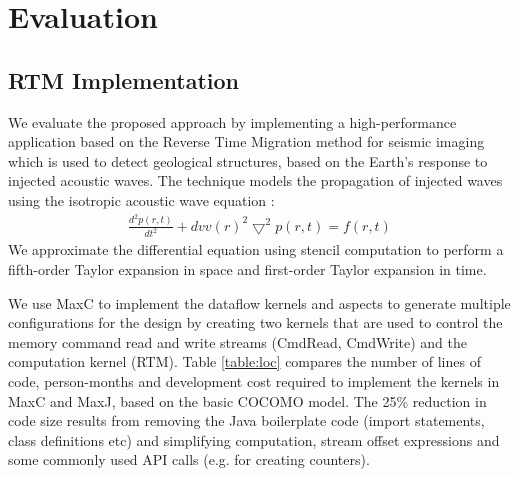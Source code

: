 \section{Evaluation}

\subsection{RTM Implementation}
We evaluate the proposed approach by implementing a high-performance
application based on the Reverse Time Migration method for seismic
imaging which is used to detect geological structures, based on the
Earth's response to injected acoustic waves. The technique models the
propagation of injected waves using the isotropic acoustic wave
equation \cite{araya2011assessing}:
\begin{align}
\frac{d^2p(r,t)}{dt^2} + {dvv(r)}^2\bigtriangledown^2p(r,t) = f(r,t)
\end{align}
We approximate the differential equation using stencil computation to
perform a fifth-order Taylor expansion in space and first-order Taylor
expansion in time.

We use MaxC to implement the dataflow kernels and aspects to generate
multiple configurations for the design by creating two kernels that
are used to control the memory command read and write streams
(CmdRead, CmdWrite) and the computation kernel (RTM). Table
\ref{table:loc} compares the number of lines of code, person-months
and development cost required to implement the kernels in MaxC and
MaxJ, based on the basic COCOMO model\cite{boehm1984software}. The
25\% reduction in code size results from removing the Java boilerplate
code (import statements, class definitions etc) and simplifying
computation, stream offset expressions and some commonly used API
calls (e.g. for creating counters).

